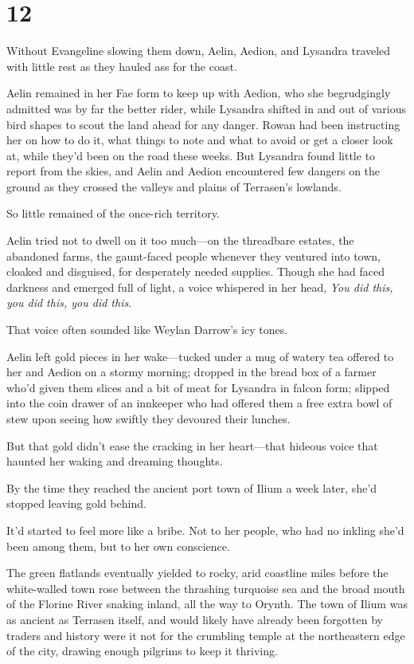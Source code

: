 
\chapter{12}

Without Evangeline slowing them down, Aelin, Aedion, and Lysandra traveled with little rest as they hauled ass for the coast.

Aelin remained in her Fae form to keep up with Aedion, who she begrudgingly admitted was by far the better rider, while Lysandra shifted in and out of various bird shapes to scout the land ahead for any danger.
Rowan had been instructing her on how to do it, what things to note and what to avoid or get a closer look at, while they'd been on the road these weeks.
But Lysandra found little to report from the skies, and Aelin and Aedion encountered few dangers on the ground as they crossed the valleys and plains of Terrasen's lowlands.

So little remained of the once-rich territory.

Aelin tried not to dwell on it too much---on the threadbare estates, the abandoned farms, the gaunt-faced people whenever they ventured into town, cloaked and disguised, for desperately needed supplies.
Though she had faced darkness and emerged full of light, a voice whispered in her head, \emph{You did this, you did this, you did this}.

That voice often sounded like Weylan Darrow's icy tones.

Aelin left gold pieces in her wake---tucked under a mug of watery tea offered to her and Aedion on a stormy morning; dropped in the bread box of a farmer who'd given them slices and a bit of meat for Lysandra in falcon form; slipped into the coin drawer of an innkeeper who had offered them a free extra bowl of stew upon seeing how swiftly they devoured their lunches.

But that gold didn't ease the cracking in her heart---that hideous voice that haunted her waking and dreaming thoughts.

By the time they reached the ancient port town of Ilium a week later, she'd stopped leaving gold behind.

It'd started to feel more like a bribe.
Not to her people, who had no inkling she'd been among them, but to her own conscience.

The green flatlands eventually yielded to rocky, arid coastline miles before the white-walled town rose between the thrashing turquoise sea and the broad mouth of the Florine River snaking inland, all the way to Orynth.
The town of Ilium was as ancient as Terrasen itself, and would likely have already been forgotten by traders and history were it not for the crumbling temple at the northeastern edge of the city, drawing enough pilgrims to keep it thriving.

